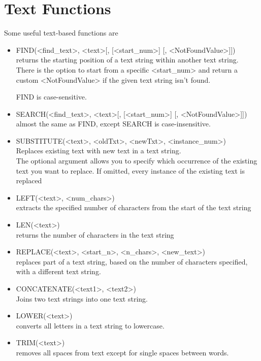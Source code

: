 \documentclass[10pt, openany, twocolumn]{book}
\begin{document}
\section{Text Functions}

Some useful text-based functions are
\begin{itemize}
    \item FIND(<find\_text>, <text>[, [<start\_num>] [, <NotFoundValue>]])\\ returns the starting position of a text string within another text string.\\
    
    There is the option to start from a specific <start\_num> and return a custom <NotFoundValue> if the given text string isn't found.
    \begin{tcolorbox}[colback=yellow!2!white, colframe=yellow!60!gray]
    FIND is case-sensitive.
    \end{tcolorbox}
    \item SEARCH(<find\_text>, <text>[, [<start\_num>] [, <NotFoundValue>]])\\ almost the same as FIND, except SEARCH is case-insensitive.
    \item SUBSTITUTE(<text>, <oldTxt>, <newTxt>, <instance\_num>)\\ Replaces existing text with new text in a text string. \\
    
    The optional argument allows you to specify which occurrence of the existing text you want to replace. If omitted, every instance of the existing text is replaced
    \item LEFT(<text>, <num\_chars>)\\ extracts the specified number of characters from the start of the text string
    \item LEN(<text>)\\ returns the number of characters in the text string
    \item REPLACE(<text>, <start\_n>, <n\_chars>, <new\_text>)\\ replaces part of a text string, based on the number of characters specified, with a different text string.
    \item CONCATENATE(<text1>, <text2>)\\ Joins two text strings into one text string.
    \item LOWER(<text>)\\ converts all letters in a text string to lowercase.
    \item TRIM(<text>) \\ removes all spaces from text except for single spaces between words.
\end{itemize}
\end{document}

